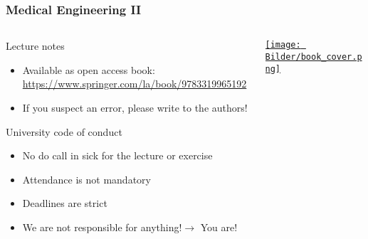 \begin{frame}
	\frametitle{Medical Engineering II}
	\begin{columns}[c, onlytextwidth]
		\begin{column}{0.6\textwidth}
			\begin{block}{Lecture notes}
				\begin{itemize}
					\item Available as open access book: \url{https://www.springer.com/la/book/9783319965192}
					\item If you suspect an error, please write to the authors!
				\end{itemize}
			\end{block}
			\begin{block}{University code of conduct}
				\begin{itemize}
					\item No do call in sick for the lecture or exercise
					\item Attendance is not mandatory
					\item Deadlines are strict
					\item We are not responsible for anything!\newline $\rightarrow$ You are!
				\end{itemize}
			\end{block}
		\end{column}\begin{column}{0.3\textwidth}
			\href{https://www.springer.com/la/book/9783319965192}{\texttt{[image: Bilder/book\_cover.png]}}
		\end{column}
	\end{columns}
\end{frame}

